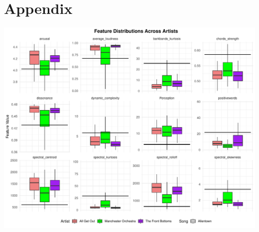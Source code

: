 \documentclass{article}\usepackage[]{graphicx}\usepackage[]{xcolor}
\begin{document}
\begin{multicols}{2}
\vspace{2em}


\begin{tiny}

\end{tiny}

\end{multicols}

\section{Appendix}

\begin{center}
\includegraphics[width=\textwidth]{feature.plot.pdf}  %
\label{boxplots}
\end{center}
\end{document}

